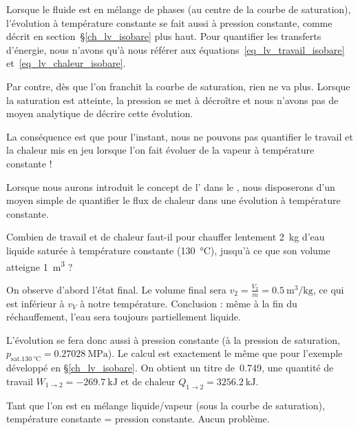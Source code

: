 		Lorsque le fluide est en mélange de phases (au centre de la courbe de saturation), l’évolution à température constante se fait aussi à pression constante, comme décrit en section~\S\ref{ch_lv_isobare} plus haut. Pour quantifier les transferts d’énergie, nous n’avons qu’à nous référer aux équations~\ref{eq_lv_travail_isobare} et~\ref{eq_lv_chaleur_isobare}.

		Par contre, dès que l’on franchit la courbe de saturation, rien ne va plus. Lorsque la saturation est atteinte, la pression se met à décroître et nous n’avons pas de moyen analytique de décrire cette évolution.
		
		La conséquence est que pour l’instant, nous ne pouvons pas quantifier le travail et la chaleur mis en jeu lorsque l’on fait évoluer de la vapeur à température constante !

		Lorsque nous aurons introduit le concept de l’ dans le \courshuitshort, nous disposerons d’un moyen simple de quantifier le flux de chaleur dans une évolution à température constante.
		
			\begin{anexample}
			
			Combien de travail et de chaleur faut-il pour chauffer lentement \SI{2}{\kilogram} d’eau liquide saturée à température constante (\SI{130}{\degreeCelsius}), jusqu’à ce que son volume atteigne \SI{1}{\metre\cubed} ?
			
				\begin{answer}
				On observe d’abord l’état final. Le volume final sera $v_2 = \frac{V_2}{m} = \SI{0,5}{\metre\cubed\per\kilogram} $, ce qui est inférieur à $v_V$ à notre température. Conclusion : même à la fin du réchauffement, l’eau sera toujours partiellement liquide.
				
				L’évolution se fera donc aussi à pression constante (à la pression de saturation, $p_{\text{sat.} \SI{130}{\degreeCelsius}} = \SI{0,27028}{\mega\pascal} $). Le calcul est exactement le même que pour l’exemple développé en \S\ref{ch_lv_isobare}. On obtient un titre de~\num{0,749}, une quantité de travail $W_{1\to2} = \SI{-269,7}{\kilo\joule}$ et de chaleur $Q_{1\to2} = \SI{+3256,2}{\kilo\joule}$.				
				
				\begin{remark}Tant que l’on est en mélange liquide/vapeur (sous la courbe de saturation), température constante = pression constante. Aucun problème.\end{remark}\end{answer}
			\end{anexample}
			
